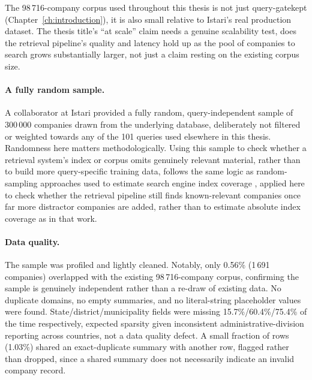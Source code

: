\documentclass[a4paper,oneside,bibliography=totoc]{scrbook}
\begin{document}
The 98\,716-company corpus used throughout this thesis is not just query-gatekept (Chapter~\ref{ch:introduction}), it is also small relative to Istari's real production dataset. The thesis title's ``at scale'' claim needs a genuine scalability test, does the retrieval pipeline's quality and latency hold up as the pool of companies to search grows substantially larger, not just a claim resting on the existing corpus size.

\paragraph{A fully random sample.} A collaborator at Istari provided a fully random, query-independent sample of 300\,000 companies drawn from the underlying database, deliberately not filtered or weighted towards any of the 101 queries used elsewhere in this thesis. Randomness here matters methodologically. Using this sample to check whether a retrieval system's index or corpus omits genuinely relevant material, rather than to build more query-specific training data, follows the same logic as random-sampling approaches used to estimate search engine index coverage \citep{baryossef2008random}, applied here to check whether the retrieval pipeline still finds known-relevant companies once far more distractor companies are added, rather than to estimate absolute index coverage as in that work.

\paragraph{Data quality.} The sample was profiled and lightly cleaned. Notably, only 0.56\% (1\,691 companies) overlapped with the existing 98\,716-company corpus, confirming the sample is genuinely independent rather than a re-draw of existing data. No duplicate domains, no empty summaries, and no literal-string placeholder values were found. State/district/municipality fields were missing 15.7\%/60.4\%/75.4\% of the time respectively, expected sparsity given inconsistent administrative-division reporting across countries, not a data quality defect. A small fraction of rows (1.03\%) shared an exact-duplicate summary with another row, flagged rather than dropped, since a shared summary does not necessarily indicate an invalid company record.
\end{document}

